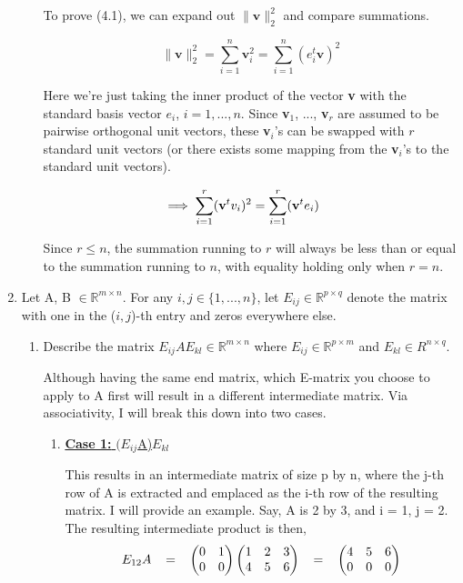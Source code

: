 \documentclass[12pt]{article}
\newcommand{\hop}{\vspace{1mm}}
\newcommand{\jump}{\vspace{5mm}}
\newcommand{\R}{\mathbb{R}}
\begin{document}
\begin{enumerate}[leftmargin=\labelsep]
\begin{enumerate}
\hop
To prove (4.1), we can expand out $\lVert \textbf{v} \rVert ^2_2$ and compare summations.

\[
\lVert \textbf{v} \rVert ^2_2 = \sum_{i = 1}^n \textbf{v}_i^2 = \sum_{i= 1}^n (e^t_i\textbf{v})^2
\]

Here we're just taking the inner product of the vector \textbf{v} with the standard basis vector $e_i$, $i = 1,..., n$. Since \textbf{v}$_1$, ..., \textbf{v}$_r$ are assumed to be pairwise orthogonal unit vectors, these \textbf{v}$_i$'s can be swapped with $r$ standard unit vectors (or there exists some mapping from the \textbf{v}$_i$'s to the standard unit vectors).

\[
\hspace{-5mm}\implies \sum_{i = 1}^r(\textbf{v}^tv_i)^2 = \sum_{i = 1}^r (\textbf{v}^te_i)
\]

Since $r \leq n$, the summation running to $r$ will always be less than or equal to the summation running to $n$, with equality holding only when $r = n$.
\end{enumerate}

\item Let A, B $\in \R^{m\times n}$. For any $i, j \in \{1, ..., n\}$, let $E_{ij} \in \R^{p \times q}$ denote the matrix with one in the ($i,j$)-th entry and zeros everywhere else.
\begin{enumerate}
    \item Describe the matrix $E_{ij}AE_{kl} \in \R^{m \times n}$ where $E_{ij} \in \R^{p\times m}$ and $E_{kl} \in R^{n \times q}.$ 

    \jump
    Although having the same end matrix, which E-matrix you choose to apply to A first will result in a different intermediate matrix. Via associativity, I will break this down into two cases.
\begin{enumerate}
    \item \underline{\textbf{Case 1:} $(E_{ij}$A)$E_{kl}$}

    \hop
    This results in an intermediate matrix of size p by n, where the j-th row of A is extracted and emplaced as the i-th row of the resulting matrix. I will provide an example. Say, A is 2 by 3, and i = 1, j = 2. The resulting intermediate product is then,
    \[
    E_{12}A
    \hspace{3mm}
    =
    \hspace{3mm}
    \begin{pmatrix}
        0   &1    \\
        0   &0    
    \end{pmatrix}
    \begin{pmatrix}
        1   &2  &3  \\
        4   &5  &6
    \end{pmatrix}
    \hspace{3mm}
    =
    \hspace{3mm}
    \begin{pmatrix}
        4   &5  &6  \\
        0   &0  &0
    \end{pmatrix}
    \]
    

\end{enumerate}
\end{enumerate}
\end{enumerate}
\end{document}
